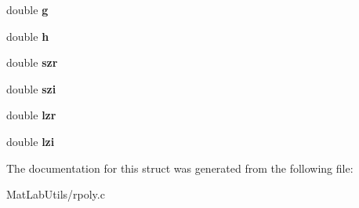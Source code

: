 \begin{DoxyCompactItemize}
double {\bfseries g}
\item 
\mbox{\label{struct_r_poly___state_a8ee9be1b5aa75abae556de3088cba6d9}} 
double {\bfseries h}
\item 
\mbox{\label{struct_r_poly___state_a3e54b6894f6a4694585055d4dd849c38}} 
double {\bfseries szr}
\item 
\mbox{\label{struct_r_poly___state_a143eaac5a856111b4112b0d51094c76d}} 
double {\bfseries szi}
\item 
\mbox{\label{struct_r_poly___state_a53e6d47f579c98c46ab0340ea776fce8}} 
double {\bfseries lzr}
\item 
\mbox{\label{struct_r_poly___state_a332ef2aff9ea857ed67b1d2dcb85a772}} 
double {\bfseries lzi}
\end{DoxyCompactItemize}


The documentation for this struct was generated from the following file\+:\begin{DoxyCompactItemize}
\item 
Mat\+Lab\+Utils/rpoly.\+c\end{DoxyCompactItemize}
